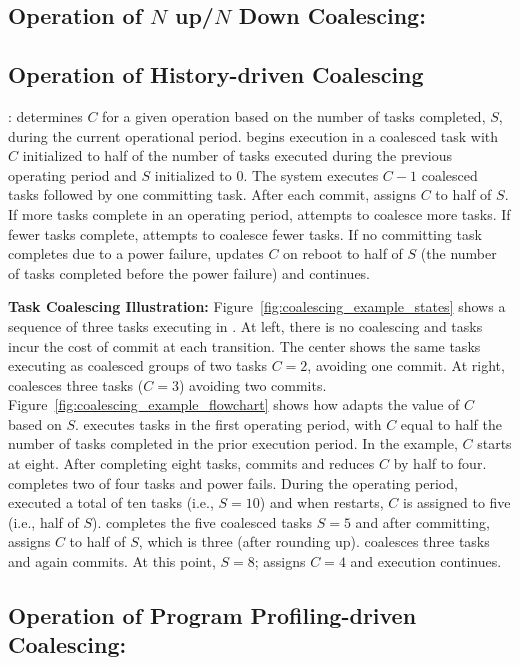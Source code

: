 \subsection{Operation of $N$ up/$N$ Down Coalescing:} 

\subsection{Operation of History-driven Coalescing}: \sys determines $C$ for a given operation based on the number of tasks completed, $S$, during the current operational period. \sys begins execution in a coalesced task with $C$ initialized to half of the number of tasks executed during the previous operating period and $S$ initialized to $0$. The system executes $C-1$ coalesced tasks followed by one committing task. After each commit, \sys assigns $C$ to half of $S$. If more tasks complete in an operating period, \sys attempts to coalesce more tasks. If fewer tasks
complete, \sys attempts to coalesce fewer tasks. If no committing task
completes due to a power failure, \sys updates $C$ on reboot to half of $S$
(the number of tasks completed before the power failure) and continues.

\noindent\textbf{Task Coalescing Illustration:}
Figure~\ref{fig:coalescing_example_states} shows a sequence of three tasks
executing in \sys. At left, there is no coalescing and tasks incur the cost of
commit at each transition. The center shows the same tasks executing as
coalesced groups of two tasks $C=2$, avoiding one commit.  At right, \sys
coalesces three tasks ($C=3$) avoiding two commits.
Figure~\ref{fig:coalescing_example_flowchart} shows how \sys adapts the value
of $C$ based on $S$. \sys executes tasks in the first operating period, with
$C$ equal to half the number of tasks completed in the prior execution period.
In the example, $C$ starts at eight. After completing eight tasks, \sys commits
and reduces $C$ by half to four.  \sys completes two of four tasks and power
fails.  During the operating period, \sys executed a total of ten tasks (i.e.,
$S=10$) and when \sys restarts, $C$ is assigned to five (i.e., half of $S$).
\sys completes the five coalesced tasks $S=5$ and after committing, assigns $C$
to half of $S$, which is three (after rounding up). \sys coalesces three tasks
and again commits.  At this point, $S=8$; \sys assigns $C=4$ and execution
continues.

\subsection{Operation of Program Profiling-driven Coalescing:} 

